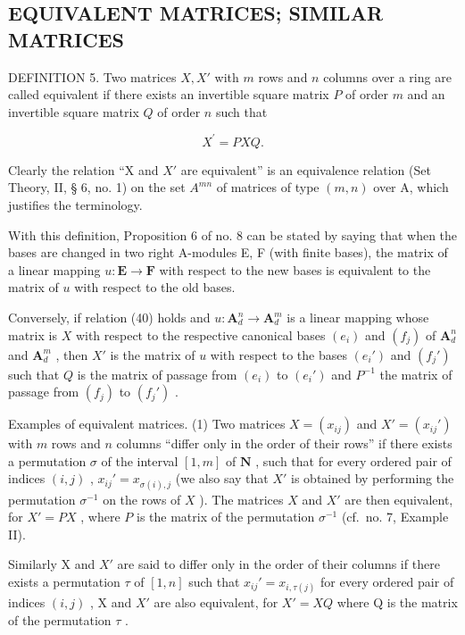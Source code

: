 \subsection{EQUIVALENT MATRICES; SIMILAR MATRICES}

DEFINITION 5. Two matrices \(X, X'\) with \(m\) rows and \(n\) columns over a ring are called equivalent if there exists an invertible square matrix \(P\) of order \(m\) and an invertible square matrix \(Q\) of order \(n\) such that

\[
X ^ {\prime} = P X Q.\tag{40}
\]

Clearly the relation ``X and \(X'\) are equivalent'' is an equivalence relation (Set Theory, II, § 6, no. 1) on the set \(A^{mn}\) of matrices of type \((m, n)\) over A, which justifies the terminology.

With this definition, Proposition 6 of no. 8 can be stated by saying that when the bases are changed in two right A-modules E, F (with finite bases), the matrix of a linear mapping \(u \colon \mathbf{E} \to \mathbf{F}\) with respect to the new bases is equivalent to the matrix of \(u\) with respect to the old bases.

Conversely, if relation (40) holds and \(u \colon \mathbf{A}_d^n \to \mathbf{A}_d^m\) is a linear mapping whose matrix is \(X\) with respect to the respective canonical bases \((e_i)\) and \((f_j)\) of \(\mathbf{A}_d^n\) and \(\mathbf{A}_d^m\) , then \(X'\) is the matrix of \(u\) with respect to the bases \((e_i')\) and \((f_j')\) such that \(Q\) is the matrix of passage from \((e_i)\) to \((e_i')\) and \(P^{-1}\) the matrix of passage from \((f_j)\) to \((f_j')\) .

Examples of equivalent matrices. (1) Two matrices \(X = (x_{ij})\) and \(X' = (x_{ij}')\) with \(m\) rows and \(n\) columns ``differ only in the order of their rows'' if there exists a permutation \(\sigma\) of the interval \([1, m]\) of \(\mathbf{N}\) , such that for every ordered pair of indices \((i,j)\) , \(x_{ij}' = x_{\sigma(i),j}\) (we also say that \(X'\) is obtained by performing the permutation \(\sigma^{-1}\) on the rows of \(X\) ). The matrices \(X\) and \(X'\) are then equivalent, for \(X' = PX\) , where \(P\) is the matrix of the permutation \(\sigma^{-1}\) (cf.~no. 7, Example II).

Similarly X and \(X'\) are said to differ only in the order of their columns if there exists a permutation \(\tau\) of \([1, n]\) such that \(x_{ij}' = x_{i,\tau(j)}\) for every ordered pair of indices \((i,j)\) , X and \(X'\) are also equivalent, for \(X' = XQ\) where Q is the matrix of the permutation \(\tau\) .

